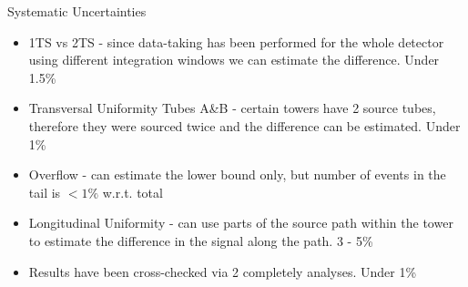 \documentclass[pdf, 9pt]{beamer}
\begin{document}
  \begin{frame}{Systematic Uncertainties}
    \begin{itemize}
      \item 1TS vs 2TS - since data-taking has been performed for the whole detector using different integration windows we can estimate the difference. \alert{Under 1.5\%}
      \item Transversal Uniformity Tubes A\&B - certain towers have 2 source tubes, therefore they were sourced twice and the difference can be estimated. \alert{Under 1\%}
      \item Overflow - can estimate the lower bound only, but number of events in the tail is $< 1\%$ w.r.t. total
      \item Longitudinal Uniformity - can use parts of the source path within the tower to estimate the difference in the signal along the path. \alert{3 - 5\%}
      \item Results have been cross-checked via 2 completely analyses. \alert{Under 1\%}
    \end{itemize}
  \end{frame}
\end{document}
